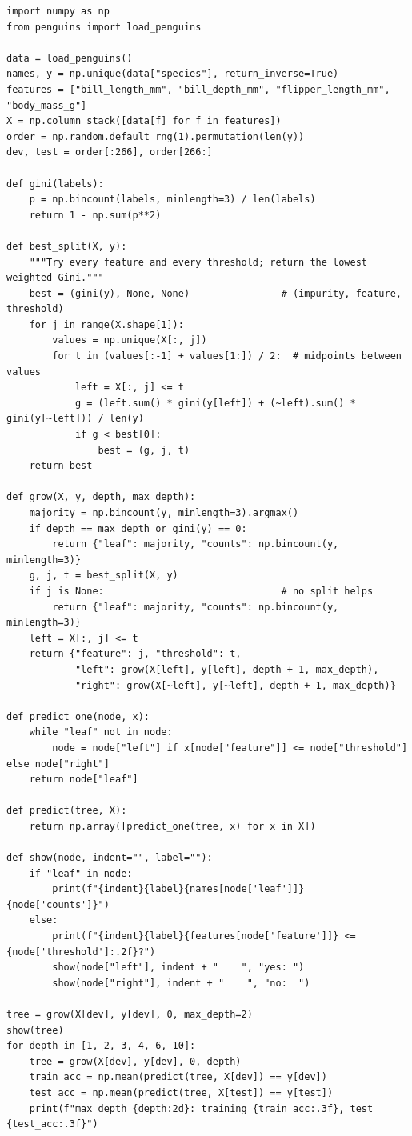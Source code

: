 \begin{verbatim}
import numpy as np
from penguins import load_penguins

data = load_penguins()
names, y = np.unique(data["species"], return_inverse=True)
features = ["bill_length_mm", "bill_depth_mm", "flipper_length_mm", "body_mass_g"]
X = np.column_stack([data[f] for f in features])
order = np.random.default_rng(1).permutation(len(y))
dev, test = order[:266], order[266:]

def gini(labels):
    p = np.bincount(labels, minlength=3) / len(labels)
    return 1 - np.sum(p**2)

def best_split(X, y):
    """Try every feature and every threshold; return the lowest weighted Gini."""
    best = (gini(y), None, None)                # (impurity, feature, threshold)
    for j in range(X.shape[1]):
        values = np.unique(X[:, j])
        for t in (values[:-1] + values[1:]) / 2:  # midpoints between values
            left = X[:, j] <= t
            g = (left.sum() * gini(y[left]) + (~left).sum() * gini(y[~left])) / len(y)
            if g < best[0]:
                best = (g, j, t)
    return best

def grow(X, y, depth, max_depth):
    majority = np.bincount(y, minlength=3).argmax()
    if depth == max_depth or gini(y) == 0:
        return {"leaf": majority, "counts": np.bincount(y, minlength=3)}
    g, j, t = best_split(X, y)
    if j is None:                               # no split helps
        return {"leaf": majority, "counts": np.bincount(y, minlength=3)}
    left = X[:, j] <= t
    return {"feature": j, "threshold": t,
            "left": grow(X[left], y[left], depth + 1, max_depth),
            "right": grow(X[~left], y[~left], depth + 1, max_depth)}

def predict_one(node, x):
    while "leaf" not in node:
        node = node["left"] if x[node["feature"]] <= node["threshold"] else node["right"]
    return node["leaf"]

def predict(tree, X):
    return np.array([predict_one(tree, x) for x in X])

def show(node, indent="", label=""):
    if "leaf" in node:
        print(f"{indent}{label}{names[node['leaf']]} {node['counts']}")
    else:
        print(f"{indent}{label}{features[node['feature']]} <= {node['threshold']:.2f}?")
        show(node["left"], indent + "    ", "yes: ")
        show(node["right"], indent + "    ", "no:  ")

tree = grow(X[dev], y[dev], 0, max_depth=2)
show(tree)
for depth in [1, 2, 3, 4, 6, 10]:
    tree = grow(X[dev], y[dev], 0, depth)
    train_acc = np.mean(predict(tree, X[dev]) == y[dev])
    test_acc = np.mean(predict(tree, X[test]) == y[test])
    print(f"max depth {depth:2d}: training {train_acc:.3f}, test {test_acc:.3f}")
\end{verbatim}

